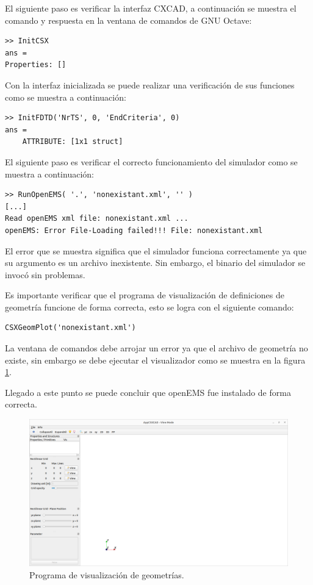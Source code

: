 \documentclass[
    11pt,
    spanish,
	a4paper
]{article}
\begin{document}
El siguiente paso es verificar la interfaz CXCAD, a continuación se muestra el
comando y respuesta en la ventana de comandos de GNU Octave:

\begin{verbatim}
>> InitCSX
ans = 
Properties: []
\end{verbatim}

Con la interfaz inicializada se puede realizar una verificación de sus funciones
como se muestra a continuación:

\begin{verbatim}
>> InitFDTD('NrTS', 0, 'EndCriteria', 0)
ans = 
    ATTRIBUTE: [1x1 struct]
\end{verbatim}

El siguiente paso es verificar el correcto funcionamiento del simulador como se
muestra a continuación:

\begin{verbatim}
>> RunOpenEMS( '.', 'nonexistant.xml', '' )
[...]
Read openEMS xml file: nonexistant.xml ...
openEMS: Error File-Loading failed!!! File: nonexistant.xml
\end{verbatim}

El error que se muestra significa que el simulador funciona correctamente ya que
su argumento es un archivo inexistente. Sin embargo, el binario del simulador se
invocó sin problemas.

Es importante verificar que el programa de visualización de definiciones de
geometría funcione de forma correcta, esto se logra con el siguiente comando:

\begin{verbatim}
CSXGeomPlot('nonexistant.xml')
\end{verbatim}

La ventana de comandos debe arrojar un error ya que el archivo de geometría no
existe, sin embargo se debe ejecutar el visualizador como se muestra en la
figura \ref{fig:geovisual}.

Llegado a este punto se puede concluir que openEMS fue instalado de forma correcta.

\begin{figure}[htbp]
	\centering
	\includegraphics[width=\textwidth]{./img/geovisual.png}
	\caption{Programa de visualización de geometrías.}
	\label{fig:geovisual}
\end{figure}
\end{document}
